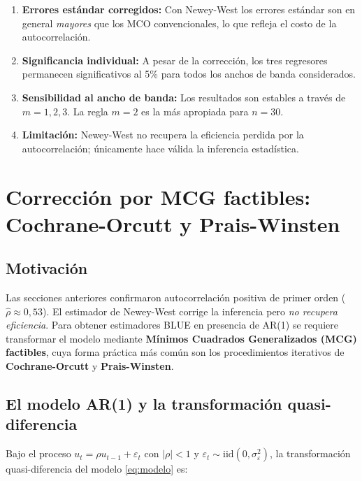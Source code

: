 \documentclass[12pt,a4paper]{article}
\begin{document}
\begin{enumerate}
  \item \textbf{Errores estándar corregidos:} Con Newey-West los errores estándar
        son en general \emph{mayores} que los MCO convencionales, lo que
        refleja el costo de la autocorrelación.

  \item \textbf{Significancia individual:} A pesar de la corrección, los tres
        regresores permanecen significativos al 5\% para todos los anchos de
        banda considerados.

  \item \textbf{Sensibilidad al ancho de banda:} Los resultados son estables
        a través de $m=1,2,3$. La regla $m=2$ es la más apropiada para $n=30$.

  \item \textbf{Limitación:} Newey-West no recupera la eficiencia perdida
        por la autocorrelación; únicamente hace válida la inferencia estadística.
\end{enumerate}

\section{Corrección por MCG factibles: Cochrane-Orcutt y Prais-Winsten}
\label{sec:G}

\subsection{Motivación}

Las secciones anteriores confirmaron autocorrelación positiva de primer orden
($\hat\rho \approx 0{,}53$). El estimador de Newey-West corrige la inferencia
pero \emph{no recupera eficiencia}. Para obtener estimadores BLUE en presencia
de AR(1) se requiere transformar el modelo mediante \textbf{Mínimos Cuadrados
Generalizados (MCG) factibles}, cuya forma práctica más común son los
procedimientos iterativos de \textbf{Cochrane-Orcutt} y \textbf{Prais-Winsten}.

\subsection{El modelo AR(1) y la transformación quasi-diferencia}

Bajo el proceso $u_t = \rho u_{t-1} + \varepsilon_t$ con $|\rho|<1$ y
$\varepsilon_t \sim \text{iid}(0,\sigma^2_\varepsilon)$, la transformación
quasi-diferencia del modelo \eqref{eq:modelo} es:
\end{document}
